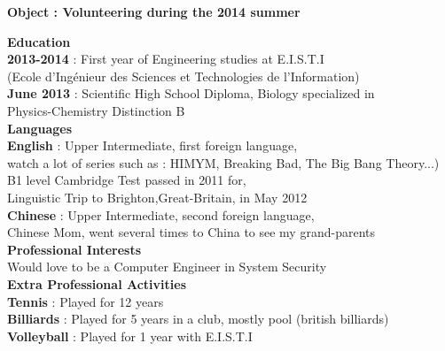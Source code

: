 \documentclass{article}%
\begin{document}
\bigskip
\bigskip
\begin{center}
	\textbf
		{ \LARGE Object : Volunteering during the 2014 summer\\ }
\end{center}
	\bigskip

\textbf{\Large Education}
\\ 
\bigskip
  \blacktriangleright 
	 \textrm{\textbf{\large 2013-2014}}  : \textrm{First year of Engineering studies at E.I.S.T.I }\\
	 \textrm{(Ecole d'Ingénieur des Sciences et Technologies de l'Information)}\\
\bigskip
\blacktriangleright \textrm{\textbf{\large June 2013} : Scientific High School Diploma, Biology specialized in} \\
	\textrm{Physics-Chemistry Distinction B}\\
\bigskip
\bigskip
\textbf{\Large Languages}
\\ 
\bigskip
\blacktriangleright \textrm{\textbf{\large English} : Upper Intermediate, first foreign language,}\\

\textrm{ watch a lot of series such as : HIMYM, Breaking Bad, The Big Bang Theory...)}\\
\textrm{B1 level Cambridge Test passed in 2011 for,}\\
\textrm{Linguistic Trip to Brighton,Great-Britain, in May 2012 }\\
\bigskip
\blacktriangleright \textrm{\textbf{\large Chinese} : Upper Intermediate, second foreign language,}\\
\textrm{Chinese Mom, went several times to China to see my grand-parents}\\
\bigskip
\bigskip
\textbf{\Large Professional Interests} \\
\bigskip
\blacktriangleright \textrm{Would love to be a Computer Engineer in System Security}\\
\bigskip
\bigskip
\textbf{\Large Extra Professional Activities}\\
\bigskip
\blacktriangleright \textrm{\textbf{\large Tennis} : Played for 12 years}\\
\bigskip
\blacktriangleright \textrm{\textbf{\large Billiards} : Played for 5 years  in a club, mostly pool (british billiards)}\\
\bigskip
\blacktriangleright \textrm{\textbf{\large Volleyball} : Played for 1 year with E.I.S.T.I}\\
\end{document}
